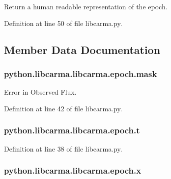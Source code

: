 Return a human readable representation of the epoch. 



Definition at line 50 of file libcarma.\-py.



\subsection{Member Data Documentation}
\hypertarget{classpython_1_1libcarma_1_1libcarma_1_1epoch_a045122b8c088225f00b0052f183aac3a}{
\subsubsection[{mask}]{\setlength{\rightskip}{0pt plus 5cm}python.\-libcarma.\-libcarma.\-epoch.\-mask}}\label{classpython_1_1libcarma_1_1libcarma_1_1epoch_a045122b8c088225f00b0052f183aac3a}


Error in Observed Flux. 



Definition at line 42 of file libcarma.\-py.

\hypertarget{classpython_1_1libcarma_1_1libcarma_1_1epoch_adc45927ca28d3e686fc64dccbe46be0a}{
\subsubsection[{t}]{\setlength{\rightskip}{0pt plus 5cm}python.\-libcarma.\-libcarma.\-epoch.\-t}}\label{classpython_1_1libcarma_1_1libcarma_1_1epoch_adc45927ca28d3e686fc64dccbe46be0a}


Definition at line 38 of file libcarma.\-py.

\hypertarget{classpython_1_1libcarma_1_1libcarma_1_1epoch_a438579d7a539c50c10f23945f3f61c24}{
\subsubsection[{x}]{\setlength{\rightskip}{0pt plus 5cm}python.\-libcarma.\-libcarma.\-epoch.\-x}}\label{classpython_1_1libcarma_1_1libcarma_1_1epoch_a438579d7a539c50c10f23945f3f61c24}


